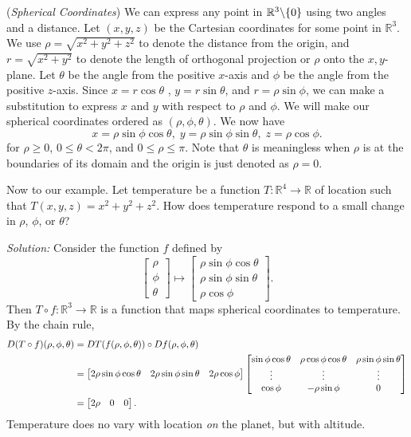 \documentclass[11pt]{article}
\theoremstyle{definition}
\newcommand{\R}{\mathbb{R}}                      %
\newcommand{\bslash}{\symbol{92}}
\newcommand{\mat}{\begin{bmatrix}}
\newcommand{\trix}{\end{bmatrix}}
\begin{document}
\ex (\textit{Spherical Coordinates}) We can express any point in $\R^3\bslash\{0\}$ using two angles and a distance. Let $(x,y,z)$ be the Cartesian coordinates for some point in $\R^3$. We use $\rho=\sqrt{x^2+y^2+z^2}$ to denote the distance from the origin, and $r=\sqrt{x^2+y^2}$ to denote the length of orthogonal projection or $\rho$ onto the $x,y$-plane. Let $\theta$ be the angle from the positive $x$-axis and $\phi$ be the angle from the positive $z$-axis. Since $x=r\cos\theta$ , $y=r\sin\theta$, and $r=\rho\sin\phi$, we can make a substitution to express $x$ and $y$ with respect to $\rho$ and $\phi$. We will make our spherical coordinates ordered as $(\rho,\phi,\theta)$. We now have
$$
x=\rho\sin\phi\cos\theta,\; y=\rho\sin\phi\sin\theta,\; z=\rho\cos\phi.
$$
for $\rho\geq 0$, $0\leq\theta<2\pi$, and $0\leq\rho\leq \pi$. Note that $\theta$ is meaningless when $\rho$ is at the boundaries of its domain and the origin is just denoted as $\rho=0$.

Now to our example. Let temperature be a function $T:\R^4\to \R$ of location such that $T(x,y,z)=x^2+y^2+z^2$. How does temperature respond to a small change in $\rho$, $\phi$, or $\theta$?

\textit{Solution:} Consider the function $f$ defined by
$$
\mat \rho\\ \phi\\ \theta \trix \mapsto \mat \rho\sin\phi\cos\theta \\ \rho\sin\phi\sin\theta \\ \rho\cos\phi \trix.
$$
Then $T\circ f:\R^3\to \R$ is a function that maps spherical coordinates to temperature. By the chain rule, 
$$
\begin{aligned}
D(T\circ f)(\rho,\phi,\theta)&=DT(f(\rho,\phi,\theta))\circ Df(\rho,\phi,\theta)\\
&=\mat 2\rho\sin\phi\cos\theta & 2\rho\sin\phi\sin\theta & 2\rho\cos\phi \trix 
\mat \sin\phi\cos\theta & \rho\cos\phi\cos\theta & \-\rho\sin\phi\sin\theta \\
\vdots & \vdots & \vdots\\
\cos\phi & -\rho\sin\phi & 0 \trix\\
&=\mat 2\rho & 0 & 0\trix.
\end{aligned}
$$
Temperature does no vary with location \textit{on} the planet, but with altitude.
\end{document}
